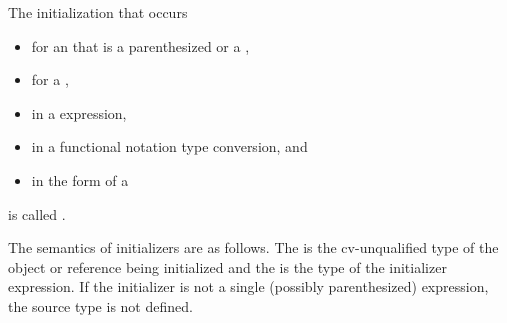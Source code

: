 \pnum
The initialization that occurs
\begin{itemize}
\item for an  that is a
parenthesized  or a ,
\item for a ,
\item in a  expression,
\item in a functional notation type conversion, and
\item in the  form of a 
\end{itemize}
is called
.

\pnum
The semantics of initializers are as follows.
The
%
is the cv-unqualified type of the object or reference being initialized and the
is the type of the initializer expression.
If the initializer is not a single (possibly parenthesized) expression, the
source type is not defined.
